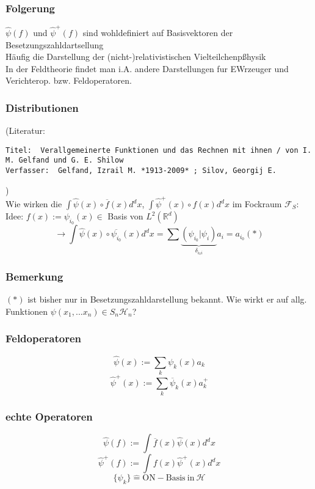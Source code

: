 \documentclass[twoside,a4paper]{scrartcl}
\newcommand{\R}{\mathbb{R}}
\renewcommand{\1}{\mathds{1}}
\newcommand{\ra}{\rightarrow}
\renewcommand{\H}{\mathcal{H}}
\newcommand{\F}{\mathcal{F}}
\renewcommand{\R}{\mathbb{R}}
\begin{document}
\subsubsection*{Folgerung}
$\hat \psi(f)$ und $\hat \psi^+(f)$ sind wohldefiniert auf Basisvektoren der Besetzungszahldartsellung\\
Häufig die Darstellung der (nicht-)relativistischen Vielteilchenpßhysik\\
In der Feldtheorie findet man i.A. andere Darstellungen fur EWrzeuger und Verichterop. bzw. Feldoperatoren.

\subsubsection*{Distributionen}
(Literatur: \begin{tiny}
\begin{verbatim}
Titel: 	Verallgemeinerte Funktionen und das Rechnen mit ihnen / von I. M. Gelfand und G. E. Shilow
Verfasser: 	Gelfand, Izrail M. *1913-2009* ; Silov, Georgij E.
\end{verbatim}
\end{tiny}
)\\
Wie wirken die $\int \hat \psi(x) \circ \overline{f}(x) d^dx$, $\int \hat \psi^+(x) \circ {f}(x) d^dx$ im Fockraum $\F_S$:\\
Idee: $f(x):= \psi_{i_0}(x) \in$ Basis von $L^2(\R^d)$\\
$$\ra \int \hat \psi(x) \circ \overline{\psi_{i_0}}(x) d^dx=\sum \underbrace{(\psi_{i_0}|\psi_i)}_{\delta_{i_0i}}a_i=a_{i_0} (*) $$
\subsubsection*{Bemerkung}
$(*)$ ist bisher nur in Besetzungszahldarstellung bekannt. Wie wirkt er auf allg. Funktionen $\psi(x_1,...x_n) \in S_n\H_n$?


\subsubsection*{Feldoperatoren}
$$\hat \psi(x):= \sum_k \psi_k(x)a_k$$
$$\hat \psi^+(x):= \sum_k \overline{\psi}_k(x)a_k^+$$
\subsubsection*{echte Operatoren}
$$\hat \psi(f):= \int \overline{f}(x)\hat \psi(x)d^dx$$
$$\hat \psi^+(f):= \int {f}(x)\hat \psi^+(x)d^dx$$
$$\{\psi_k\} \mathrel{\widehat{=}} \mathrm{ON-Basis \ in}\  \H$$
\end{document}
